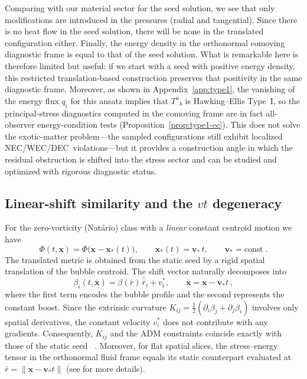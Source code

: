 \documentclass[11pt]{article}
\makeatletter
\newcommand{\@abbr}[1]{\ifmmode\mathrm{#1}\else\textsc{#1}\fi}
\newcommand{\WEC}{\@abbr{WEC}}
\newcommand{\NEC}{\@abbr{NEC}}
\newcommand{\DEC}{\@abbr{DEC}}
\makeatother
\begin{document}
Comparing with our material sector for the seed solution, we see that only modifications are introduced in the pressures (radial and tangential). Since there is no heat flow in the seed solution, there will be none in the translated configuration either. Finally, the energy density in the orthonormal comoving diagnostic frame is equal to that of the seed solution. What is remarkable here is therefore limited but useful: if we start with a seed with positive energy density, this restricted translation-based construction preserves that positivity in the same diagnostic frame. Moreover, as shown in Appendix~\ref{app:type1}, the vanishing of the energy flux $q_i$ for this ansatz implies that $T^a{}_b$ is Hawking--Ellis Type~I, so the principal-stress diagnostics computed in the comoving frame are in fact all-observer energy-condition tests (Proposition~\ref{prop:type1-ec}). This does not solve the exotic-matter problem---the sampled configurations still exhibit localized \NEC/\WEC/\DEC\ violations---but it provides a construction angle in which the residual obstruction is shifted into the stress sector and can be studied and optimized with rigorous diagnostic status.

\subsection{Linear-shift similarity and the \texorpdfstring{$vt$}{vt} degeneracy}
\label{sec:vt-similarity}
For the zero-vorticity (Nat\'ario) class with a \emph{linear} constant centroid motion we have
\begin{equation}
    \Phi(t,\mathbf x)=\Phi\big(\mathbf x-\mathbf x_*(t)\big),\qquad \mathbf x_*(t)=\mathbf v_*\,t,\qquad \mathbf v_* = \text{const}\;.
\end{equation}
The translated metric is obtained from the static seed by a rigid spatial translation of the bubble centroid. The shift vector naturally decomposes into
\begin{equation}
    \beta_i(t,\bar{\mathbf x})=\beta(\bar r)\,\hat{\bar r}_i + v^*_{i},\qquad \bar{\mathbf x}=\mathbf x-\mathbf v_* t\,,
\end{equation}
where the first term encodes the bubble profile and the second represents the constant boost. Since the extrinsic curvature $K_{ij}=\tfrac12(\partial_i\beta_j+\partial_j\beta_i)$ involves only spatial derivatives, the constant velocity $v^*_i$ does not contribute with any gradients. Consequently, $K_{ij}$ and the ADM constraints coincide exactly with those of the static seed ~\cite{Arnowitt:1962hi,Wald1984ucp,Alcub2008itnr}. Moreover, for flat spatial slices, the stress--energy tensor in the orthonormal fluid frame equals its static counterpart evaluated at $\bar r=\|\mathbf x-\mathbf v_* t\|$ (see \cite{Santiago:2021aup,Schuster:2023ADMmass} for more details).
\end{document}
